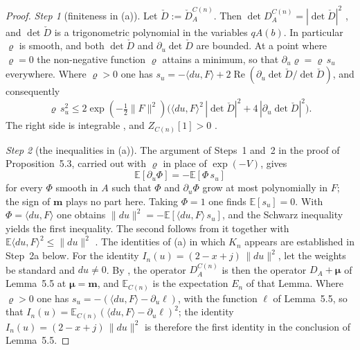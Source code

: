 \documentclass[11pt]{amsart}
\theoremstyle{definition}
\begin{document}
\begin{proof}
\emph{Step 1} (finiteness in (a)).
Let $\check D:=\check D^{C(n)}_A$.
Then $\det D^{C(n)}_A=|\det\check D|^2$ \cite[Proposition~3.18\,(d)]{QEDII}, and $\det\check D$ is a trigonometric polynomial in the variables $qA(b)$.
In particular $\varrho$ is smooth, and both $\det\check D$ and $\partial_u\det\check D$ are bounded.
At a point where $\varrho=0$ the non-negative function $\varrho$ attains a minimum, so that $\partial_u\varrho=\varrho\,s_u$ everywhere.
Where $\varrho>0$ one has $s_u=\allowbreak -\langle du,\allowbreak F\rangle+2\operatorname{Re}(\partial_u\det\check D/\det\check D)$, and consequently
\begin{equation*}
\varrho\,s_u^2\le2\exp(-\tfrac12\|F\|^2)\bigl(\langle du,F\rangle^2\,|\det\check D|^2+4\,|\partial_u\det\check D|^2\bigr).
\end{equation*}
The right side is integrable \cite[Lemma~3.14]{QEDII}, and $Z_{C(n)}[1]>0$ \cite[Theorem~4.26]{QEDII}.

\emph{Step 2} (the inequalities in (a)).
The argument of Steps~1 and~2 in the proof of Proposition~5.3, carried out with $\varrho$ in place of $\exp(-V)$, gives
\begin{equation*}
\mathbb E[\partial_u\Phi]=-\mathbb E[\Phi\,s_u]
\end{equation*}
for every $\Phi$ smooth in $A$ such that $\Phi$ and $\partial_u\Phi$ grow at most polynomially in $F$; the sign of $\mathbf m$ plays no part here.
Taking $\Phi=1$ one finds $\mathbb E[s_u]=0$.
With $\Phi=\langle du,F\rangle$ one obtains $\|du\|^2=-\mathbb E[\langle du,F\rangle\,s_u]$, and the Schwarz inequality yields the first inequality.
The second follows from it together with $\mathbb E\langle du,F\rangle^2\le\|du\|^2$ \cite[Theorem~6.27\,(b)]{QEDII}.
The identities of (a) in which $K_n$ appears are established in Step~2a below.
For the identity $I_n(u)=(2-x+j)\,\|du\|^2$, let the weights be standard and $du\ne0$.
By \cite[(I.2.5), Proposition~46\,(b)]{QEDIII}, the operator $D^{C(n)}_A$ is then the operator $D_A+\boldsymbol\mu$ of Lemma~5.5 at $\boldsymbol\mu=\mathbf m$, and $\mathbb E_{C(n)}$ is the expectation $E_n$ of that Lemma.
Where $\varrho>0$ one has $s_u=-(\langle du,F\rangle-\partial_u\ell)$, with the function $\ell$ of Lemma~5.5, so that $I_n(u)=\mathbb E_{C(n)}(\langle du,F\rangle-\partial_u\ell)^2$; the identity $I_n(u)=(2-x+j)\,\|du\|^2$ is therefore the first identity in the conclusion of Lemma~5.5.


\end{proof}
\end{document}
